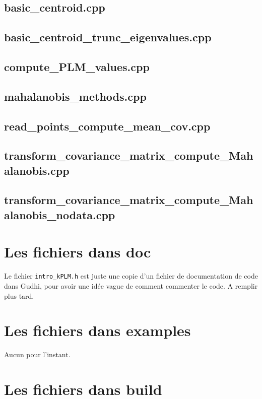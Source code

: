 \documentclass[10pt,a4paper,notitlepage]{article}
\begin{document}

\subsection{basic\_centroid.cpp}
\subsection{basic\_centroid\_trunc\_eigenvalues.cpp}
\subsection{compute\_PLM\_values.cpp}
\subsection{mahalanobis\_methods.cpp}
\subsection{read\_points\_compute\_mean\_cov.cpp}
\subsection{transform\_covariance\_matrix\_compute\_Mahalanobis.cpp}
\subsection{transform\_covariance\_matrix\_compute\_Mahalanobis\_nodata.cpp}

\section{Les fichiers dans doc}

Le fichier \texttt{intro\_kPLM.h} est juste une copie d'un fichier de documentation de code dans Gudhi, pour avoir une idée vague de comment commenter le code.
A remplir plus tard.

\section{Les fichiers dans examples}

Aucun pour l'instant.

\section{Les fichiers dans build}
\end{document}
